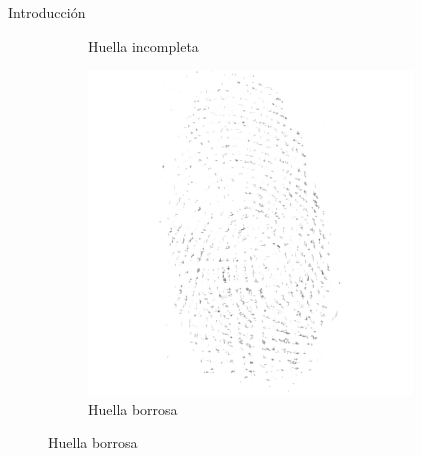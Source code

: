 \documentclass[12pt,aspectratio=169]{beamer}
\begin{document}
\begin{frame}{Introducción}
\begin{figure}
\begin{subfigure}{0.23\textwidth}
            \caption{Huella incompleta}
        \end{subfigure}
        \begin{subfigure}{0.23\textwidth}
            \centering
            \includegraphics[scale=0.3]{figs/deteriorada_0.png}
            \caption{Huella borrosa}
        \end{subfigure}
    \end{figure}

\end{frame}
\end{document}
